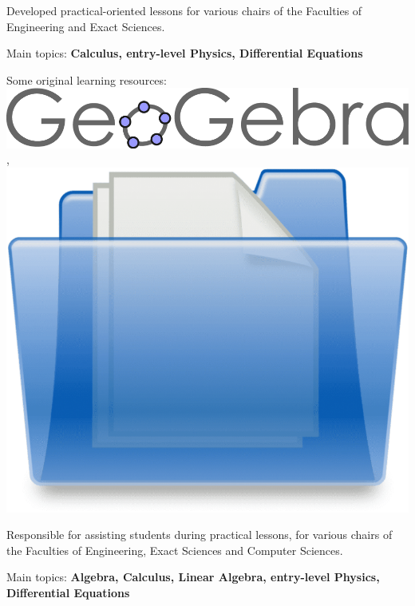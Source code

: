 \begin{zitemize}
\item Developed practical-oriented lessons for various chairs of the Faculties of Engineering and Exact Sciences.
\item Main topics: \textbf{Calculus, entry-level Physics, Differential Equations}
\item Some original learning resources: \href{https://www.geogebra.org/u/juanjogervasio}{\includegraphics[scale=0.15]{Geogebra-logo.png}} , \href{https://drive.google.com/drive/folders/1O8sMBLMmO2oliVsF-9rBn2s2qDtSGJUr?usp=sharing}{\includegraphics[scale=0.01]{folder.png}}
\end{zitemize}

\begin{zitemize}
\item Responsible for assisting students during practical lessons, for various chairs of the Faculties of Engineering, Exact Sciences and Computer Sciences.
\item Main topics: \textbf{Algebra, Calculus, Linear Algebra, entry-level Physics, Differential Equations}
\end{zitemize}

